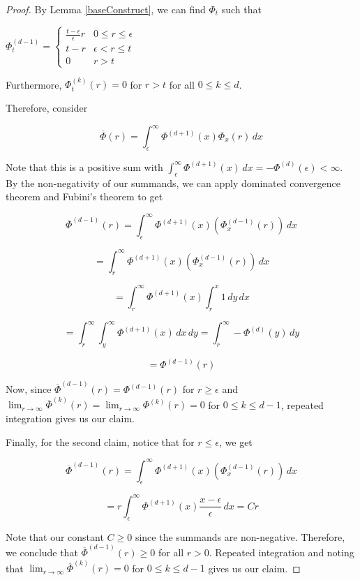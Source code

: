 \begin{proof}
By Lemma \ref{baseConstruct}, we can find $\Phi_t$ such that

$\Phi_t^{(d-1)} = \begin{cases}
\frac{t-\epsilon}{\epsilon } r & 0 \leq r \leq \epsilon \\
t - r & \epsilon < r \leq t \\
0 & r > t
\end{cases}$

Furthermore, $\Phi_t^{(k)}(r) = 0$ for $r > t$ for all $0 \leq k \leq d$.

Therefore, consider 

\[\overline{\Phi}(r) = \int_{\epsilon}^\infty \Phi^{(d+1)}(x) \Phi_x(r) \, dx\] 

Note that this is a positive sum with $\int_{\epsilon}^\infty \Phi^{(d+1)}(x) \, dx = -\Phi^{(d)}(\epsilon) < \infty$. By the non-negativity of our summands, we can apply dominated convergence theorem and Fubini's theorem to get

\[\overline{\Phi}^{(d-1)}(r) = \int_{\epsilon}^\infty  \Phi^{(d+1)}(x) (\Phi_x^{(d-1)}(r)) \, dx\] 

\[ = \int_{r}^\infty  \Phi^{(d+1)}(x) (\Phi_x^{(d-1)}(r)) \, dx\] 

\[ = \int_r^\infty \Phi^{(d+1)}(x) \int_r^x 1 \, dy \,dx \]

\[= \int_r^\infty \int_y^\infty \Phi^{(d+1)}(x) \, dx \, dy = \int_r^\infty  -\Phi^{(d)}(y) \, dy\]

\[ = \Phi^{(d-1)}(r)\]

Now, since $\overline{\Phi}^{(d-1)}(r) = \Phi^{(d-1)}(r)$ for $r\geq \epsilon$ and $\lim_{r\to\infty} \overline{\Phi}^{(k)}(r) = \lim_{r\to\infty} {\Phi}^{(k)}(r) = 0$ for $0 \leq k \leq d-1$, repeated integration gives us our claim. 

Finally, for the second claim, notice that for $r \leq \epsilon$, we get

\[\overline{\Phi}^{(d-1)}(r) = \int_{\epsilon}^\infty  \Phi^{(d+1)}(x) (\Phi_x^{(d-1)}(r)) \, dx\] 

\[ =  r \int_\epsilon^\infty \Phi^{(d+1)}(x) \frac{x - \epsilon}{\epsilon} \, dx = Cr  \]

Note that our constant $C \geq 0$ since the summands are non-negative. Therefore, we conclude that $\overline{\Phi}^{(d-1)}(r) \geq 0$ for all $r > 0$. Repeated integration and noting that $\lim_{r\to\infty} \overline{\Phi}^{(k)}(r) = 0$ for $0 \leq k \leq d-1$ gives us our claim.


\end{proof}
